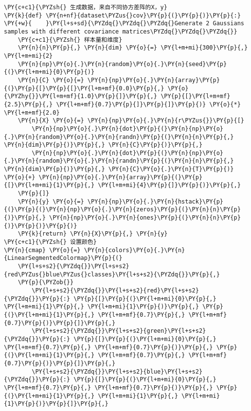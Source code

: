 \begin{Verbatim}[commandchars=\\\{\}]
\PY{c+c1}{\PYZsh{} 生成数据，来自不同协方差阵的X，y}
\PY{k}{def} \PY{n+nf}{dataset\PYZus{}cov}\PY{p}{(}\PY{p}{)}\PY{p}{:}
\PY{+w}{    }\PY{l+s+sd}{\PYZdq{}\PYZdq{}\PYZdq{}Generate 2 Gaussians samples with different covariance matrices\PYZdq{}\PYZdq{}\PYZdq{}}
    \PY{c+c1}{\PYZsh{} 样本量和维度}
    \PY{n}{n}\PY{p}{,} \PY{n}{dim} \PY{o}{=} \PY{l+m+mi}{300}\PY{p}{,} \PY{l+m+mi}{2}
    \PY{n}{np}\PY{o}{.}\PY{n}{random}\PY{o}{.}\PY{n}{seed}\PY{p}{(}\PY{l+m+mi}{0}\PY{p}{)}
    \PY{n}{C} \PY{o}{=} \PY{n}{np}\PY{o}{.}\PY{n}{array}\PY{p}{(}\PY{p}{[}\PY{p}{[}\PY{l+m+mf}{0.0}\PY{p}{,} \PY{o}{\PYZhy{}}\PY{l+m+mf}{1.0}\PY{p}{]}\PY{p}{,} \PY{p}{[}\PY{l+m+mf}{2.5}\PY{p}{,} \PY{l+m+mf}{0.7}\PY{p}{]}\PY{p}{]}\PY{p}{)} \PY{o}{*} \PY{l+m+mf}{2.0}
    \PY{n}{X} \PY{o}{=} \PY{n}{np}\PY{o}{.}\PY{n}{r\PYZus{}}\PY{p}{[}
        \PY{n}{np}\PY{o}{.}\PY{n}{dot}\PY{p}{(}\PY{n}{np}\PY{o}{.}\PY{n}{random}\PY{o}{.}\PY{n}{randn}\PY{p}{(}\PY{n}{n}\PY{p}{,} \PY{n}{dim}\PY{p}{)}\PY{p}{,} \PY{n}{C}\PY{p}{)}\PY{p}{,}
        \PY{n}{np}\PY{o}{.}\PY{n}{dot}\PY{p}{(}\PY{n}{np}\PY{o}{.}\PY{n}{random}\PY{o}{.}\PY{n}{randn}\PY{p}{(}\PY{n}{n}\PY{p}{,} \PY{n}{dim}\PY{p}{)}\PY{p}{,} \PY{n}{C}\PY{o}{.}\PY{n}{T}\PY{p}{)} \PY{o}{+} \PY{n}{np}\PY{o}{.}\PY{n}{array}\PY{p}{(}\PY{p}{[}\PY{l+m+mi}{1}\PY{p}{,} \PY{l+m+mi}{4}\PY{p}{]}\PY{p}{)}\PY{p}{,}
    \PY{p}{]}
    \PY{n}{y} \PY{o}{=} \PY{n}{np}\PY{o}{.}\PY{n}{hstack}\PY{p}{(}\PY{p}{(}\PY{n}{np}\PY{o}{.}\PY{n}{zeros}\PY{p}{(}\PY{n}{n}\PY{p}{)}\PY{p}{,} \PY{n}{np}\PY{o}{.}\PY{n}{ones}\PY{p}{(}\PY{n}{n}\PY{p}{)}\PY{p}{)}\PY{p}{)}
    \PY{k}{return} \PY{n}{X}\PY{p}{,} \PY{n}{y}
\PY{c+c1}{\PYZsh{} 设置颜色}
\PY{n}{cmap} \PY{o}{=} \PY{n}{colors}\PY{o}{.}\PY{n}{LinearSegmentedColormap}\PY{p}{(}
    \PY{l+s+s2}{\PYZdq{}}\PY{l+s+s2}{red\PYZus{}blue\PYZus{}classes}\PY{l+s+s2}{\PYZdq{}}\PY{p}{,}
    \PY{p}{\PYZob{}}
        \PY{l+s+s2}{\PYZdq{}}\PY{l+s+s2}{red}\PY{l+s+s2}{\PYZdq{}}\PY{p}{:} \PY{p}{[}\PY{p}{(}\PY{l+m+mi}{0}\PY{p}{,} \PY{l+m+mi}{1}\PY{p}{,} \PY{l+m+mi}{1}\PY{p}{)}\PY{p}{,} \PY{p}{(}\PY{l+m+mi}{1}\PY{p}{,} \PY{l+m+mf}{0.7}\PY{p}{,} \PY{l+m+mf}{0.7}\PY{p}{)}\PY{p}{]}\PY{p}{,}
        \PY{l+s+s2}{\PYZdq{}}\PY{l+s+s2}{green}\PY{l+s+s2}{\PYZdq{}}\PY{p}{:} \PY{p}{[}\PY{p}{(}\PY{l+m+mi}{0}\PY{p}{,} \PY{l+m+mf}{0.7}\PY{p}{,} \PY{l+m+mf}{0.7}\PY{p}{)}\PY{p}{,} \PY{p}{(}\PY{l+m+mi}{1}\PY{p}{,} \PY{l+m+mf}{0.7}\PY{p}{,} \PY{l+m+mf}{0.7}\PY{p}{)}\PY{p}{]}\PY{p}{,}
        \PY{l+s+s2}{\PYZdq{}}\PY{l+s+s2}{blue}\PY{l+s+s2}{\PYZdq{}}\PY{p}{:} \PY{p}{[}\PY{p}{(}\PY{l+m+mi}{0}\PY{p}{,} \PY{l+m+mf}{0.7}\PY{p}{,} \PY{l+m+mf}{0.7}\PY{p}{)}\PY{p}{,} \PY{p}{(}\PY{l+m+mi}{1}\PY{p}{,} \PY{l+m+mi}{1}\PY{p}{,} \PY{l+m+mi}{1}\PY{p}{)}\PY{p}{]}\PY{p}{,}

\end{Verbatim}
